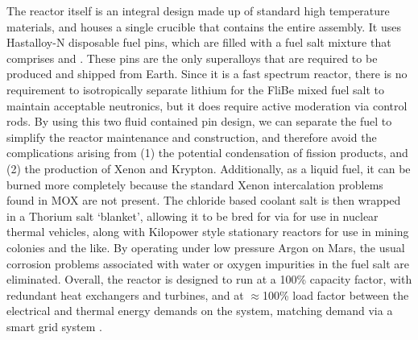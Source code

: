 \documentclass[fleqn,10pt]{Stylesheet} %
\begin{document}
The reactor itself is an integral design made up of standard high temperature materials, and houses a single crucible that contains the entire assembly. It uses Hastalloy-N disposable fuel pins, which are filled with a fuel salt mixture that comprises  and . These pins are the only superalloys that are required to be produced and shipped from Earth. Since it is a fast spectrum reactor, there is no requirement to isotropically separate lithium for the FliBe mixed fuel salt to maintain acceptable neutronics, but it does require active moderation via control rods. By using this two fluid contained pin design, we can separate the fuel to simplify the reactor maintenance and construction, and therefore avoid the complications arising from (1) the potential condensation of fission products, and (2) the production of Xenon and Krypton. Additionally, as a liquid fuel, it can be burned more completely because the standard Xenon intercalation problems found in MOX are not present. The chloride based coolant salt is then wrapped in a Thorium salt ‘blanket’, allowing it to be bred for  via  for use in nuclear thermal vehicles, along with Kilopower style stationary reactors for use in mining colonies and the like. By operating under low pressure Argon on Mars, the usual corrosion problems associated with water or oxygen impurities in the fuel salt are eliminated. Overall, the reactor is designed to run at a 100\% capacity factor, with redundant heat exchangers and turbines, and at $\approx$100\% load factor between the electrical and thermal energy demands on the system, matching demand via a smart grid system \cite{Shultis2016}. 
\end{document}
